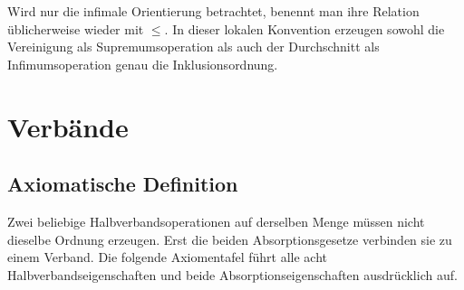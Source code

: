 \documentclass[main.tex]{subfiles}
\begin{document}
\begin{tabproofwide}
\end{tabproofwide}

Wird nur die infimale Orientierung betrachtet, benennt man ihre Relation
üblicherweise wieder mit \(\leq\). In dieser lokalen Konvention erzeugen
sowohl die Vereinigung als Supremumsoperation als auch der Durchschnitt als
Infimumsoperation genau die Inklusionsordnung.

\chapter{Verbände}

\section{Axiomatische Definition}

Zwei beliebige Halbverbandsoperationen auf derselben Menge müssen nicht
dieselbe Ordnung erzeugen. Erst die beiden Absorptionsgesetze verbinden sie zu
einem Verband. Die folgende Axiomentafel führt alle acht Halbverbandseigenschaften
und beide Absorptionseigenschaften ausdrücklich auf.

\par\smallskip

\end{document}
